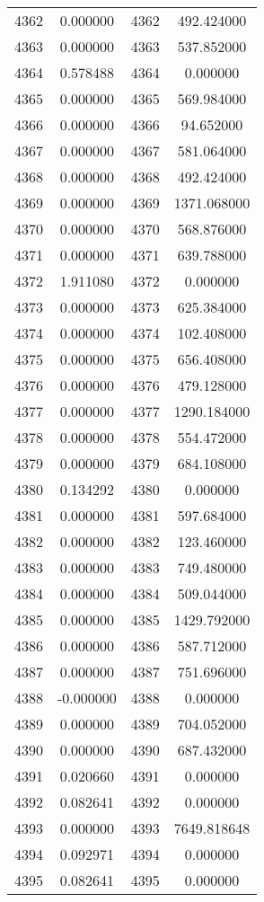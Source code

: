 \documentclass[12pt]{article}
\begin{document}
\begin{longtable}{@{}cccc@{}}
4362 & 0.000000 & 4362 & 492.424000 \\
4363 & 0.000000 & 4363 & 537.852000 \\
4364 & 0.578488 & 4364 & 0.000000 \\
4365 & 0.000000 & 4365 & 569.984000 \\
4366 & 0.000000 & 4366 & 94.652000 \\
4367 & 0.000000 & 4367 & 581.064000 \\
4368 & 0.000000 & 4368 & 492.424000 \\
4369 & 0.000000 & 4369 & 1371.068000 \\
4370 & 0.000000 & 4370 & 568.876000 \\
4371 & 0.000000 & 4371 & 639.788000 \\
4372 & 1.911080 & 4372 & 0.000000 \\
4373 & 0.000000 & 4373 & 625.384000 \\
4374 & 0.000000 & 4374 & 102.408000 \\
4375 & 0.000000 & 4375 & 656.408000 \\
4376 & 0.000000 & 4376 & 479.128000 \\
4377 & 0.000000 & 4377 & 1290.184000 \\
4378 & 0.000000 & 4378 & 554.472000 \\
4379 & 0.000000 & 4379 & 684.108000 \\
4380 & 0.134292 & 4380 & 0.000000 \\
4381 & 0.000000 & 4381 & 597.684000 \\
4382 & 0.000000 & 4382 & 123.460000 \\
4383 & 0.000000 & 4383 & 749.480000 \\
4384 & 0.000000 & 4384 & 509.044000 \\
4385 & 0.000000 & 4385 & 1429.792000 \\
4386 & 0.000000 & 4386 & 587.712000 \\
4387 & 0.000000 & 4387 & 751.696000 \\
4388 & -0.000000 & 4388 & 0.000000 \\
4389 & 0.000000 & 4389 & 704.052000 \\
4390 & 0.000000 & 4390 & 687.432000 \\
4391 & 0.020660 & 4391 & 0.000000 \\
4392 & 0.082641 & 4392 & 0.000000 \\
4393 & 0.000000 & 4393 & 7649.818648 \\
4394 & 0.092971 & 4394 & 0.000000 \\
4395 & 0.082641 & 4395 & 0.000000 \\

\end{longtable}
\end{document}
